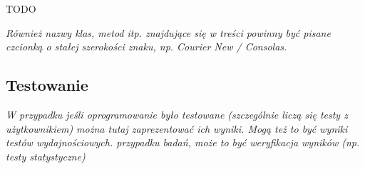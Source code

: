 TODO

\textit{Również nazwy klas, metod itp. znajdujące się w treści powinny być pisane czcionką o stałej szerokości znaku, np. Courier New / Consolas. }

\subsection{Testowanie}
\textit{W przypadku jeśli oprogramowanie było testowane (szczególnie liczą się testy z użytkownikiem) można tutaj zaprezentować ich wyniki. Mogą też to być wyniki testów wydajnościowych. przypadku badań, może to być weryfikacja wyników (np. testy statystyczne)}
